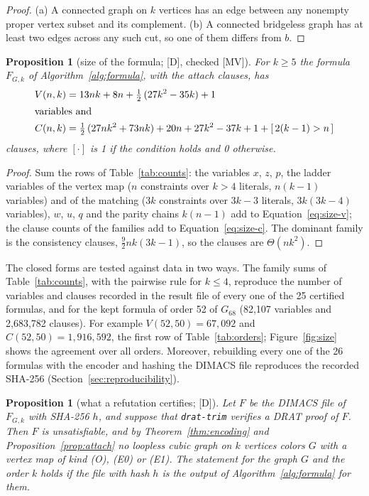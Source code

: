 \documentclass[11pt]{article}
\newtheorem{proposition}[theorem]{Proposition}
\theoremstyle{definition}
\theoremstyle{remark}
\newcommand{\Gsix}{G_{68}}
\newcommand{\evD}{\textnormal{[D]}}
\newcommand{\evMV}{\textnormal{[MV]}}
\begin{document}
\begin{proof}
(a) A connected graph on $k$ vertices has an edge between any nonempty proper vertex subset and its complement. (b) A connected bridgeless graph has at least two edges across any such cut, so one of them differs from $b$.
\end{proof}

\begin{proposition}[size of the formula; \evD, checked \evMV]\label{prop:size}
For $k \ge 5$ the formula $F_{G,k}$ of Algorithm~\ref{alg:formula}, with the attach clauses, has
\begin{align}
V(n,k) &= 13nk + 8n + \tfrac12\,(27k^2 - 35k) + 1 \label{eq:size-v}\\
\intertext{variables and}
C(n,k) &= \tfrac12\,(27nk^2 + 73nk) + 20n + 27k^2 - 37k + 1 + [\,2(k-1) > n\,] \label{eq:size-c}
\end{align}
clauses, where $[\cdot]$ is 1 if the condition holds and 0 otherwise.
\end{proposition}

\begin{proof}
Sum the rows of Table~\ref{tab:counts}: the variables $x$, $z$, $p$, the ladder variables of the vertex map ($n$ constraints over $k > 4$ literals, $n(k-1)$ variables) and of the matching ($3k$ constraints over $3k-3$ literals,
$3k(3k-4)$ variables), $w$, $u$, $q$ and the parity chains $k(n-1)$ add to Equation~\eqref{eq:size-v}; the clause counts of the families add to Equation~\eqref{eq:size-c}. The dominant family is the consistency clauses, $\tfrac92 nk(3k-1)$, so the
clauses are $\Theta(nk^2)$.
\end{proof}

The closed forms are tested against data in two ways. The family sums of Table~\ref{tab:counts}, with the pairwise rule for $k \le 4$, reproduce the number of variables and clauses recorded in the result file of every one of the 25 certified
formulas, and for the kept formula of order 52 of $\Gsix$ (82{,}107 variables and 2{,}683{,}782 clauses). For example $V(52,50) = 67{,}092$ and $C(52,50) = 1{,}916{,}592$, the first row of Table~\ref{tab:orders}; Figure~\ref{fig:size} shows the agreement over all orders.
Moreover, rebuilding every one of the 26 formulas with the encoder and hashing the DIMACS file reproduces the recorded SHA-256 (Section~\ref{sec:reproducibility}).

\begin{proposition}[what a refutation certifies; \evD]\label{prop:certified}
Let $F$ be the DIMACS file of $F_{G,k}$ with SHA-256 $h$, and suppose that \texttt{drat-trim} verifies a DRAT proof of $F$. Then $F$ is unsatisfiable, and by Theorem~\ref{thm:encoding} and Proposition~\ref{prop:attach} no
loopless cubic graph on $k$ vertices colors $G$ with a vertex map of kind (O), (E0) or (E1). The statement for the graph $G$ and the order $k$ holds if the file with hash $h$ is the output of Algorithm~\ref{alg:formula} for them.
\end{proposition}
\end{document}
